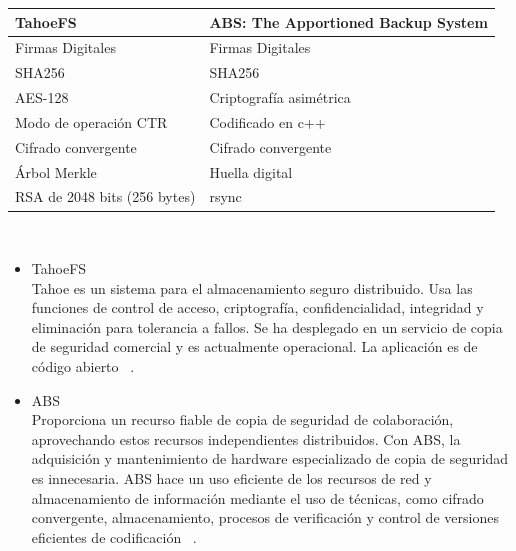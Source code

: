 \begin{tabular}{ |p{8cm}|p{8cm}| }
\hline
{ \textbf{TahoeFS}}  & {\textbf{ABS: The Apportioned Backup System} } \\
\hline
{Firmas Digitales}  & {Firmas Digitales} \\
\hline
{SHA256}  & {SHA256}  \\
\hline
{AES-128}  & {Criptografía asimétrica}  \\
\hline
{Modo de operación CTR }  & {Codificado en c++} \\
\hline
{Cifrado convergente}  & {Cifrado convergente}  \\
\hline
{Árbol Merkle}  & {Huella digital} \\
\hline
{RSA de 2048 bits (256 bytes) }  & { rsync  } \\
\hline
\end{tabular}
\\
\begin{itemize}
\item TahoeFS\\
Tahoe es un sistema para el almacenamiento seguro distribuido. Usa las funciones de control de acceso, criptografía, confidencialidad, integridad y eliminación para tolerancia a fallos. Se ha desplegado en un servicio de copia de seguridad comercial y es actualmente operacional. La aplicación es de código abierto ~\cite{tahoe}.
\item ABS\\
Proporciona un recurso fiable de copia de seguridad de colaboración, aprovechando estos recursos independientes distribuidos. Con ABS, la adquisición y mantenimiento de hardware especializado de copia de seguridad es innecesaria. ABS hace un uso eficiente de los recursos de red y almacenamiento de información mediante el uso de técnicas, como cifrado convergente, almacenamiento, procesos de verificación y control de versiones eficientes de codificación ~\cite{abs}.
\end{itemize}
